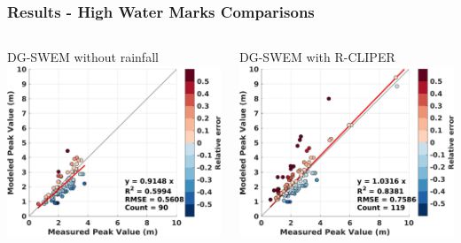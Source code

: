 \documentclass[10pt]{oden_beamer}
\begin{document}



\begin{frame}
  \frametitle{Results - High Water Marks Comparisons}
  \begin{columns}
    \centering
    \vspace{0.5cm}
    \centering
    DG-SWEM without rainfall
    \includegraphics[width=\linewidth]{2008_norain.jpg}

    \centering
    \vspace{0.5cm}
    \centering
    DG-SWEM with R-CLIPER
    \includegraphics[width=\linewidth]{2008_rain.jpg}

  \end{columns}
\end{frame}
\end{document}
